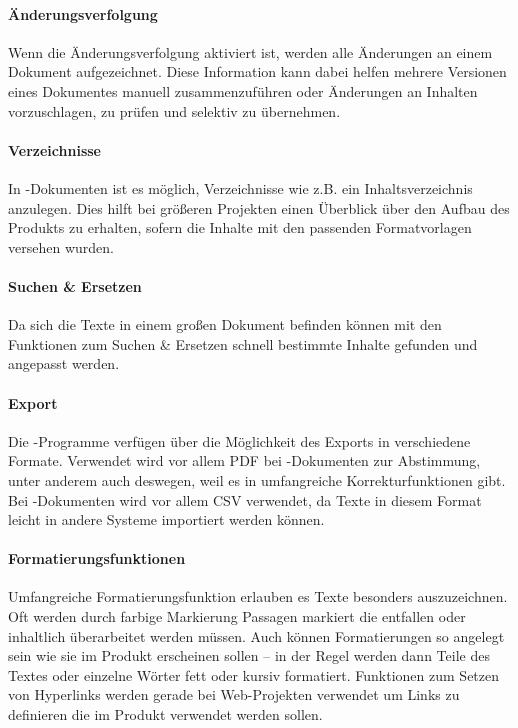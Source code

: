 \paragraph{Änderungsverfolgung} Wenn die Änderungsverfolgung aktiviert ist, werden alle Änderungen an einem Dokument aufgezeichnet. Diese Information kann dabei helfen mehrere Versionen eines Dokumentes manuell zusammenzuführen oder Änderungen an Inhalten vorzuschlagen, zu prüfen und selektiv zu übernehmen.

\paragraph{Verzeichnisse} In -Dokumenten ist es möglich, Verzeichnisse wie z.B. ein Inhaltsverzeichnis anzulegen. Dies hilft bei größeren Projekten einen Überblick über den Aufbau des Produkts zu erhalten, sofern die Inhalte mit den passenden Formatvorlagen versehen wurden.

\paragraph{Suchen \& Ersetzen} Da sich die Texte in einem großen Dokument befinden können mit den Funktionen zum Suchen \& Ersetzen schnell bestimmte Inhalte gefunden und angepasst werden.

\paragraph{Export} Die -Programme verfügen über die Möglichkeit des Exports in verschiedene Formate. Verwendet wird vor allem PDF bei -Dokumenten zur Abstimmung, unter anderem auch deswegen, weil es in   umfangreiche Korrekturfunktionen gibt. Bei -Dokumenten wird vor allem CSV verwendet, da Texte in diesem Format leicht in andere Systeme importiert werden können.

\paragraph{Formatierungsfunktionen} Umfangreiche Formatierungsfunktion erlauben es Texte besonders auszuzeichnen. Oft werden durch farbige Markierung Passagen markiert die entfallen oder inhaltlich überarbeitet werden müssen. Auch können Formatierungen so angelegt sein wie sie im Produkt erscheinen sollen -- in der Regel werden dann Teile des Textes oder einzelne Wörter fett oder kursiv formatiert. Funktionen zum Setzen von Hyperlinks werden gerade bei Web-Projekten verwendet um Links zu definieren die im Produkt verwendet werden sollen.

